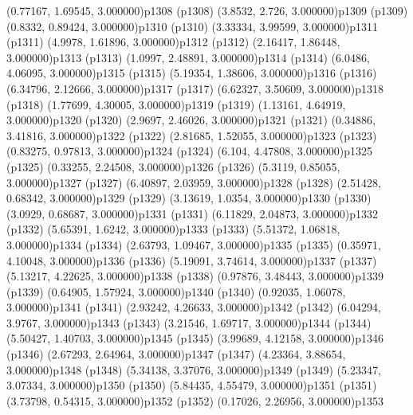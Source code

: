 \psPoint(0.77167, 1.69545, 3.000000){p1308}
\psdot(p1308)
\psPoint(3.8532, 2.726, 3.000000){p1309}
\psdot(p1309)
\psPoint(0.8332, 0.89424, 3.000000){p1310}
\psdot(p1310)
\psPoint(3.33334, 3.99599, 3.000000){p1311}
\psdot(p1311)
\psPoint(4.9978, 1.61896, 3.000000){p1312}
\psdot(p1312)
\psPoint(2.16417, 1.86448, 3.000000){p1313}
\psdot(p1313)
\psPoint(1.0997, 2.48891, 3.000000){p1314}
\psdot(p1314)
\psPoint(6.0486, 4.06095, 3.000000){p1315}
\psdot(p1315)
\psPoint(5.19354, 1.38606, 3.000000){p1316}
\psdot(p1316)
\psPoint(6.34796, 2.12666, 3.000000){p1317}
\psdot(p1317)
\psPoint(6.62327, 3.50609, 3.000000){p1318}
\psdot(p1318)
\psPoint(1.77699, 4.30005, 3.000000){p1319}
\psdot(p1319)
\psPoint(1.13161, 4.64919, 3.000000){p1320}
\psdot(p1320)
\psPoint(2.9697, 2.46026, 3.000000){p1321}
\psdot(p1321)
\psPoint(0.34886, 3.41816, 3.000000){p1322}
\psdot(p1322)
\psPoint(2.81685, 1.52055, 3.000000){p1323}
\psdot(p1323)
\psPoint(0.83275, 0.97813, 3.000000){p1324}
\psdot(p1324)
\psPoint(6.104, 4.47808, 3.000000){p1325}
\psdot(p1325)
\psPoint(0.33255, 2.24508, 3.000000){p1326}
\psdot(p1326)
\psPoint(5.3119, 0.85055, 3.000000){p1327}
\psdot(p1327)
\psPoint(6.40897, 2.03959, 3.000000){p1328}
\psdot(p1328)
\psPoint(2.51428, 0.68342, 3.000000){p1329}
\psdot(p1329)
\psPoint(3.13619, 1.0354, 3.000000){p1330}
\psdot(p1330)
\psPoint(3.0929, 0.68687, 3.000000){p1331}
\psdot(p1331)
\psPoint(6.11829, 2.04873, 3.000000){p1332}
\psdot(p1332)
\psPoint(5.65391, 1.6242, 3.000000){p1333}
\psdot(p1333)
\psPoint(5.51372, 1.06818, 3.000000){p1334}
\psdot(p1334)
\psPoint(2.63793, 1.09467, 3.000000){p1335}
\psdot(p1335)
\psPoint(0.35971, 4.10048, 3.000000){p1336}
\psdot(p1336)
\psPoint(5.19091, 3.74614, 3.000000){p1337}
\psdot(p1337)
\psPoint(5.13217, 4.22625, 3.000000){p1338}
\psdot(p1338)
\psPoint(0.97876, 3.48443, 3.000000){p1339}
\psdot(p1339)
\psPoint(0.64905, 1.57924, 3.000000){p1340}
\psdot(p1340)
\psPoint(0.92035, 1.06078, 3.000000){p1341}
\psdot(p1341)
\psPoint(2.93242, 4.26633, 3.000000){p1342}
\psdot(p1342)
\psPoint(6.04294, 3.9767, 3.000000){p1343}
\psdot(p1343)
\psPoint(3.21546, 1.69717, 3.000000){p1344}
\psdot(p1344)
\psPoint(5.50427, 1.40703, 3.000000){p1345}
\psdot(p1345)
\psPoint(3.99689, 4.12158, 3.000000){p1346}
\psdot(p1346)
\psPoint(2.67293, 2.64964, 3.000000){p1347}
\psdot(p1347)
\psPoint(4.23364, 3.88654, 3.000000){p1348}
\psdot(p1348)
\psPoint(5.34138, 3.37076, 3.000000){p1349}
\psdot(p1349)
\psPoint(5.23347, 3.07334, 3.000000){p1350}
\psdot(p1350)
\psPoint(5.84435, 4.55479, 3.000000){p1351}
\psdot(p1351)
\psPoint(3.73798, 0.54315, 3.000000){p1352}
\psdot(p1352)
\psPoint(0.17026, 2.26956, 3.000000){p1353}
